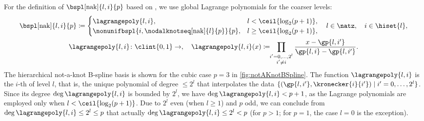 For the definition of 
$\bspl[\nak]{l,i}{p}$ based on ,
we use global Lagrange polynomials for the coarser levels:
\begin{subequations}
  \label{eq:hierarchicalNotAKnotBSpline}
  \begin{gather}
    \bspl[\nak]{l,i}{p}
    \ceq
    \begin{cases}
      \lagrangepoly{l,i},&
      l < \ceil{\log_2(p+1)},\\
      \nonunifbspl{i,\nodalknotseq[\nak]{l}{p}}{p},&
      l \ge \ceil{\log_2(p+1)},
    \end{cases}\quad
    l \in \natz,\quad
    i \in \hiset{l},\\
    \lagrangepoly{l,i}\colon \clint{0, 1} \to \real,\quad
    \lagrangepoly{l,i}(x)
    \ceq \!\!\prod_{\substack{i'=0,\dotsc,2^l\\i'\not=i}}
    \frac{x - \gp{l,i'}}{\gp{l,i} - \gp{l,i'}}.
  \end{gather}
\end{subequations}
The hierarchical not-a-knot B-spline basis is shown for the
cubic case $p = 3$ in \cref{fig:notAKnotBSpline}.
The function $\lagrangepoly{l,i}$ is the $i$-th
 of level $l$, that is,
the unique polynomial of degree $\le 2^l$ that interpolates the data
$\{(\gp{l,i'}, \kronecker{i}{i'}) \mid i' = 0, \dotsc, 2^l\}$.
Since its degree $\deg \lagrangepoly{l,i}$ is bounded by $2^l$,
we have $\deg \lagrangepoly{l,i} < p + 1$,
as the Lagrange polynomials are employed only when
$l < \ceil{\log_2(p+1)}$.
Due to $2^l$ even (when $l \ge 1$) and $p$ odd,
we can conclude from $\deg \lagrangepoly{l,i} \le 2^l \le p$ that actually
$\deg \lagrangepoly{l,i} \le 2^l < p$
(for $p > 1$; for $p = 1$, the case $l = 0$ is the exception).


